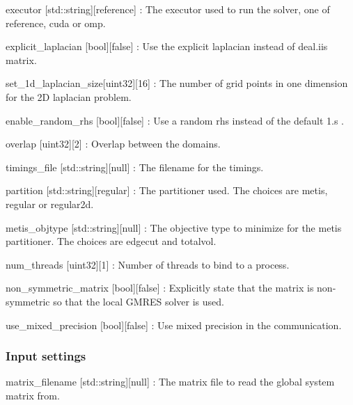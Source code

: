 \begin{DoxyItemize}
\item {\ttfamily executor} \mbox{[}std\+::string\mbox{]}\mbox{[}reference\mbox{]} \+: The executor used to run the solver, one of {\ttfamily reference}, {\ttfamily cuda} or {\ttfamily omp}.
\item {\ttfamily explicit\+\_\+laplacian} \mbox{[}bool\mbox{]}\mbox{[}false\mbox{]} \+: Use the explicit laplacian instead of deal.\+ii\textquotesingle{}s matrix.
\item {\ttfamily set\+\_\+1d\+\_\+laplacian\+\_\+size}\mbox{[}uint32\mbox{]}\mbox{[}16\mbox{]} \+: The number of grid points in one dimension for the 2D laplacian problem.
\item {\ttfamily enable\+\_\+random\+\_\+rhs} \mbox{[}bool\mbox{]}\mbox{[}false\mbox{]} \+: Use a random rhs instead of the default 1.\textquotesingle{}s .
\item {\ttfamily overlap} \mbox{[}uint32\mbox{]}\mbox{[}2\mbox{]} \+: Overlap between the domains.
\item {\ttfamily timings\+\_\+file} \mbox{[}std\+::string\mbox{]}\mbox{[}null\mbox{]} \+: The filename for the timings.
\item {\ttfamily partition} \mbox{[}std\+::string\mbox{]}\mbox{[}regular\mbox{]} \+: The partitioner used. The choices are {\ttfamily metis}, {\ttfamily regular} or {\ttfamily regular2d}.
\item {\ttfamily metis\+\_\+objtype} \mbox{[}std\+::string\mbox{]}\mbox{[}null\mbox{]} \+: The objective type to minimize for the metis partitioner. The choices are {\ttfamily edgecut} and {\ttfamily totalvol}.
\item {\ttfamily num\+\_\+threads} \mbox{[}uint32\mbox{]}\mbox{[}1\mbox{]} \+: Number of threads to bind to a process.
\item {\ttfamily non\+\_\+symmetric\+\_\+matrix} \mbox{[}bool\mbox{]}\mbox{[}false\mbox{]} \+: Explicitly state that the matrix is non-\/symmetric so that the local G\+M\+R\+ES solver is used.
\item {\ttfamily use\+\_\+mixed\+\_\+precision} \mbox{[}bool\mbox{]}\mbox{[}false\mbox{]} \+: Use mixed precision in the communication.
\end{DoxyItemize}

\subsubsection*{Input settings}


\begin{DoxyItemize}
\item {\ttfamily matrix\+\_\+filename} \mbox{[}std\+::string\mbox{]}\mbox{[}null\mbox{]} \+: The matrix file to read the global system matrix from.
\end{DoxyItemize}

